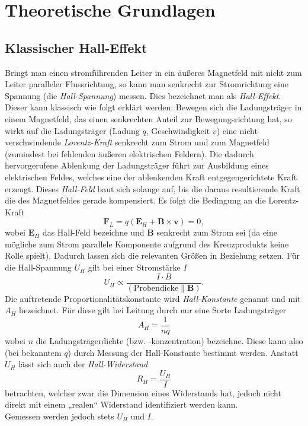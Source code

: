 \section{Theoretische Grundlagen}

\renewcommand{\V}[1]{\textbf{#1}}

\subsection{Klassischer Hall-Effekt}\label{sec:HallEffekt}

Bringt man einen stromführenden Leiter in ein äußeres Magnetfeld mit nicht zum Leiter paralleler Flussrichtung, so kann man senkrecht zur Stromrichtung eine Spannung (die \emph{Hall-Spannung}) messen. Dies bezeichnet man als \emph{Hall-Effekt}.
Dieser kann klassisch wie folgt erklärt werden:
Bewegen sich die Ladungsträger in einem Magnetfeld, das einen senkrechten Anteil zur Bewegungsrichtung hat, so wirkt auf die Ladungsträger (Ladung $q$, Geschwindigkeit $v$) eine nicht-verschwindende \emph{Lorentz-Kraft} senkrecht zum Strom und zum Magnetfeld (zumindest bei fehlenden äußeren elektrischen Feldern). Die dadurch hervorgerufene Ablenkung der Ladungsträger führt zur Ausbildung eines elektrischen Feldes, welches eine der ablenkenden Kraft entgegengerichtete Kraft erzeugt. Dieses \emph{Hall-Feld} baut sich solange auf, bis die daraus resultierende Kraft die des Magnetfeldes gerade kompensiert.
Es folgt die Bedingung an die Lorentz-Kraft
$$\V F_L = q(\V E_H + \V B\times \V v) = 0,$$
wobei $\V E_H$ das Hall-Feld bezeichne und $\V B$ senkrecht zum Strom sei (da eine mögliche zum Strom parallele Komponente aufgrund des Kreuzprodukts keine Rolle spielt).
Dadurch lassen sich die relevanten Größen in Beziehung setzen. Für die Hall-Spannung $U_H$ gilt bei einer Stromstärke $I$
\begin{equation}\label{eq:HallSpannung}
U_H\propto\frac{I\cdot B}{(\text{Probendicke}\parallel \V B)}.
\end{equation}
Die auftretende Proportionalitätskonstante wird \emph{Hall-Konstante} genannt und mit $A_H$ bezeichnet. Für diese gilt bei Leitung durch nur eine Sorte Ladungsträger
\begin{equation}
A_H = \frac{1}{nq}
\end{equation}
wobei $n$ die Ladungsträgerdichte (bzw. -konzentration) bezeichne. Diese kann also (bei
bekanntem $q$) durch Messung der Hall-Konstante bestimmt werden.
Anstatt $U_H$ lässt sich auch der \emph{Hall-Widerstand}
\begin{equation}\label{eq:HallWiderstand}
R_H = \frac{U_H}{I}
\end{equation}
betrachten, welcher zwar die Dimension eines Widerstands hat, jedoch nicht direkt mit einem „realen“ Widerstand identifiziert werden kann.\\
Gemessen werden jedoch stets $U_H$ und $I$.


